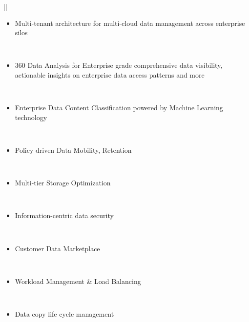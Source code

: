 \documentclass[letterpaper,10pt,english]{sphinxhowto}
\begin{document}
\begin{savenotes}\sphinxattablestart
\centering
\begin{tabular}[t]{|*{1}{|}}
\hline
\begin{itemize}
\item {} 
Multi-tenant architecture for multi-cloud data management across enterprise silos

\end{itemize}
\\
\hline\begin{itemize}
\item {} 
360 Data Analysis for Enterprise grade comprehensive data visibility, actionable
insights on enterprise data access patterns and more

\end{itemize}
\\
\hline\begin{itemize}
\item {} 
Enterprise Data Content Classification powered by Machine Learning technology

\end{itemize}
\\
\hline\begin{itemize}
\item {} 
Policy driven Data Mobility, Retention

\end{itemize}
\\
\hline\begin{itemize}
\item {} 
Multi-tier Storage Optimization

\end{itemize}
\\
\hline\begin{itemize}
\item {} 
Information-centric data security

\end{itemize}
\\
\hline\begin{itemize}
\item {} 
Customer Data Marketplace

\end{itemize}
\\
\hline\begin{itemize}
\item {} 
Workload Management \& Load Balancing

\end{itemize}
\\
\hline\begin{itemize}
\item {} 
Data copy life cycle management


\end{itemize}
\end{tabular}
\end{savenotes}
\end{document}
